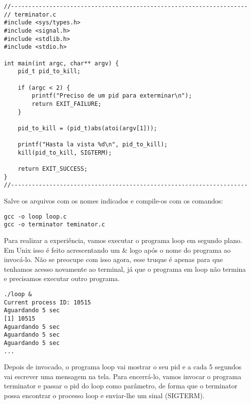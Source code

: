 \newpage

\begin{espacosimples}
\begin{verbatim}
//--------------------------------------------------------------------
// terminator.c
#include <sys/types.h>
#include <signal.h>
#include <stdlib.h>
#include <stdio.h>

int main(int argc, char** argv) {
    pid_t pid_to_kill;
    
    if (argc < 2) {
        printf("Preciso de um pid para exterminar\n");
        return EXIT_FAILURE;
    }
    
    pid_to_kill = (pid_t)abs(atoi(argv[1]));
    
    printf("Hasta la vista %d\n", pid_to_kill);
    kill(pid_to_kill, SIGTERM);
    
    return EXIT_SUCCESS;
}
//--------------------------------------------------------------------
\end{verbatim}
\end{espacosimples}

Salve os arquivos com os nomes indicados e compile-os com os comandos:

\begin{espacosimples}
\begin{verbatim}
gcc -o loop loop.c
gcc -o terminator teminator.c
\end{verbatim}
\end{espacosimples}

Para realizar a experiência, vamos executar o programa loop em segundo plano. Em Unix isso é feito acrescentando um \& logo após o nome do programa ao invocá-lo. Não se preocupe com isso agora, esse truque é apenas para que tenhamos acesso novamente ao terminal, já que o programa em loop não termina e precisamos executar outro programa.

\begin{espacosimples}
\begin{verbatim}
./loop &
Current process ID: 10515
Aguardando 5 sec
[1] 10515
Aguardando 5 sec
Aguardando 5 sec
Aguardando 5 sec
...
\end{verbatim}
\end{espacosimples}

Depois de invocado, o programa loop vai mostrar o seu pid e a cada 5 segundos vai escrever uma mensagem na tela. Para encerrá-lo, vamos invocar o programa terminator e passar o pid do loop como parâmetro, de forma que o terminator possa encontrar o processo loop e enviar-lhe um sinal (SIGTERM).


